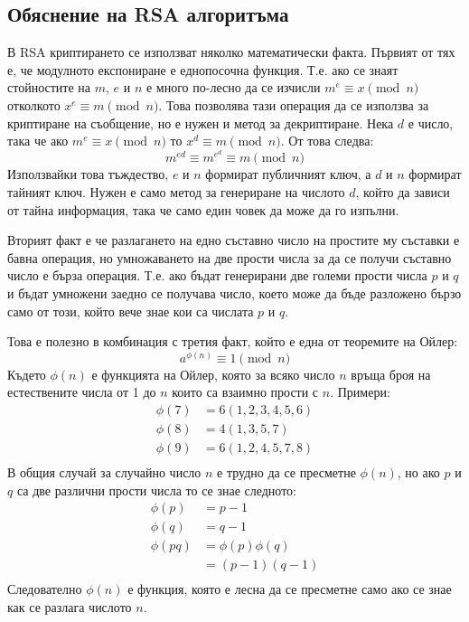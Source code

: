   \subsection{Обяснение на RSA алгоритъма} \label{rsa}
  В RSA криптирането се използват няколко математически факта. Първият от тях е, че модулното експониране е еднопосочна функция. Т.е. ако се знаят стойностите на $m$, $e$ и $n$ е много по-лесно да се изчисли $m^e \equiv x \pmod{n}$ отколкото $x^e \equiv m \pmod{n}$. Това позволява тази операция да се използва за криптиране на съобщение, но е нужен и метод за декриптиране. Нека $d$ е число, така че ако $m^e \equiv x \pmod{n}$ то $x^d \equiv m \pmod{n}$. От това следва:
  \begin{equation}
    m^{ed} \equiv m^{e^d} \equiv m \pmod{n}
    \label{rsa-key-cancelation}
  \end{equation}
  Използвайки това тъждество, $e$ и $n$ формират публичният ключ, а $d$ и $n$ формират тайният ключ. Нужен е само метод за генериране на числото $d$, който да зависи от тайна информация, така че само един човек да може да го изпълни.

  Вторият факт е че разлагането на едно съставно число на простите му съставки е бавна операция, но умножаването на две прости числа за да се получи съставно число е бърза операция. Т.е. ако бъдат генерирани две големи прости числа $p$ и $q$ и бъдат умножени заедно се получава число, което може да бъде разложено бързо само от този, който вече знае кои са числата $p$ и $q$.

  Това е полезно в комбинация с третия факт, който е една от теоремите на Ойлер:
  \begin{equation}
    a^{\phi(n)} \equiv 1 \pmod{n}
    \label{rsa-euler-theorem}
  \end{equation}
  Където $\phi(n)$ е функцията на Ойлер, която за всяко число $n$ връща броя на естествените числа от 1 до $n$ които са взаимно прости с $n$. Примери:
  \begin{equation}
    \begin{split}
      \phi(7) &= 6 (1,2,3,4,5,6) \\
      \phi(8) &= 4 (1,3,5,7) \\
      \phi(9) &= 6 (1,2,4,5,7,8) \\
    \end{split}
    \label{rsa-euler-function}
  \end{equation}
  В общия случай за случайно число $n$ е трудно да се пресметне $\phi(n)$, но ако $p$ и $q$ са две различни прости числа то се знае следното:
  \begin{equation}
    \begin{split}
      \phi(p) &= p-1 \\
      \phi(q) &= q-1 \\
      \phi(pq) &= \phi(p)\phi(q) \\
      &= (p-1)(q-1) \\
    \end{split}
    \label{rsa-phi-calculation}
  \end{equation}
  Следователно $\phi(n)$ е функция, която е лесна да се пресметне само ако се знае как се разлага числото $n$.

